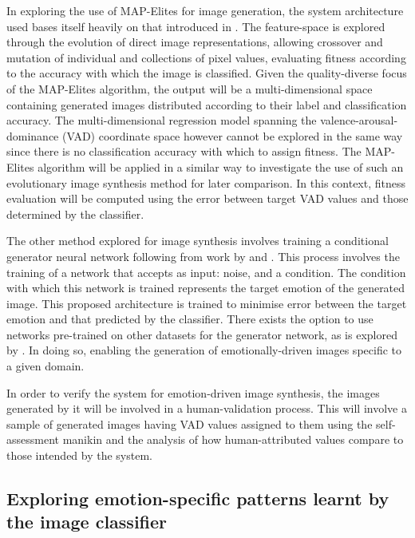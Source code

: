 \documentclass{article}
\begin{document}
In exploring the use of MAP-Elites for image generation, the system architecture used bases itself heavily on that introduced in \citet{nguyen2015innovation}.
The feature-space is explored through the evolution of direct image representations, allowing crossover and mutation of individual and collections of pixel values, evaluating fitness according to the accuracy with which the image is classified.
Given the quality-diverse focus of the MAP-Elites algorithm, the output will be a multi-dimensional space containing generated images distributed according to their label and classification accuracy.
The multi-dimensional regression model spanning the valence-arousal-dominance (VAD) coordinate space however cannot be explored in the same way since there is no classification accuracy with which to assign fitness.
The MAP-Elites algorithm will be applied in a similar way to investigate the use of such an evolutionary image synthesis method for later comparison.
In this context, fitness evaluation will be computed using the error between target VAD values and those determined by the classifier.

The other method explored for image synthesis involves training a conditional generator neural network following from work by \citet{tan2017artgan} and \citet{gauthier2014conditional}.
This process involves the training of a network that accepts as input: noise, and a condition.
The condition with which this network is trained represents the target emotion of the generated image.
This proposed architecture is trained to minimise error between the target emotion and that predicted by the classifier.
There exists the option to use networks pre-trained on other datasets for the generator network, as is explored by \citet{nguyen2016synthesizing}.
In doing so, enabling the generation of emotionally-driven images specific to a given domain.

In order to verify the system for emotion-driven image synthesis, the images generated by it will be involved in a human-validation process.
This will involve a sample of generated images having VAD values assigned to them using the self-assessment manikin \citep{bradley1994measuring} and the analysis of how human-attributed values compare to those intended by the system.

\subsection{Exploring emotion-specific patterns learnt by the image classifier}
\end{document}

